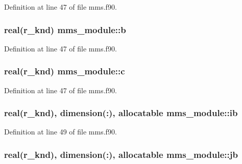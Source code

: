 Definition at line 47 of file mms.\-f90.

\hypertarget{classmms__module_adb85ae57ca25aea5f2e91f7df6d53dc1}{
\subsubsection[{b}]{\setlength{\rightskip}{0pt plus 5cm}real(r\-\_\-knd) mms\-\_\-module\-::b\hspace{0.3cm}{\ttfamily [private]}}}\label{classmms__module_adb85ae57ca25aea5f2e91f7df6d53dc1}


Definition at line 47 of file mms.\-f90.

\hypertarget{classmms__module_a6bd089f9df8ee45c901b6830eca017f6}{
\subsubsection[{c}]{\setlength{\rightskip}{0pt plus 5cm}real(r\-\_\-knd) mms\-\_\-module\-::c\hspace{0.3cm}{\ttfamily [private]}}}\label{classmms__module_a6bd089f9df8ee45c901b6830eca017f6}


Definition at line 47 of file mms.\-f90.

\hypertarget{classmms__module_aaca218de11850fada15be6a3bbeb5159}{
\subsubsection[{ib}]{\setlength{\rightskip}{0pt plus 5cm}real(r\-\_\-knd), dimension(\-:), allocatable mms\-\_\-module\-::ib\hspace{0.3cm}{\ttfamily [private]}}}\label{classmms__module_aaca218de11850fada15be6a3bbeb5159}


Definition at line 49 of file mms.\-f90.

\hypertarget{classmms__module_a53a60661b3d933e48dbf0a926a4b010c}{
\subsubsection[{jb}]{\setlength{\rightskip}{0pt plus 5cm}real(r\-\_\-knd), dimension(\-:), allocatable mms\-\_\-module\-::jb\hspace{0.3cm}{\ttfamily [private]}}}\label{classmms__module_a53a60661b3d933e48dbf0a926a4b010c}


